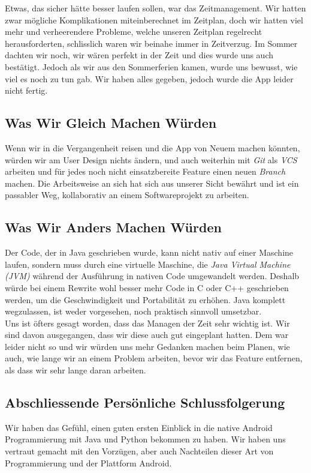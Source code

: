 \documentclass[a4paper,11pt]{article}
\begin{document}
Etwas, das sicher hätte besser laufen sollen, war das Zeitmanagement. Wir hatten zwar mögliche Komplikationen miteinberechnet im Zeitplan, doch wir hatten viel mehr und verheerendere Probleme, welche unseren Zeitplan regelrecht herausforderten, schlisslich waren wir beinahe immer in Zeitverzug. Im Sommer dachten wir noch, wir wären perfekt in der Zeit und dies wurde uns auch bestätigt. Jedoch
als wir aus den Sommerferien kamen, wurde uns bewusst, wie viel es noch zu tun gab. Wir haben alles gegeben, jedoch wurde die App leider nicht fertig. 

\subsection{Was Wir Gleich Machen Würden}
Wenn wir in die Vergangenheit reisen und die App von Neuem machen könnten, würden wir am User Design nichts ändern, und auch weiterhin mit \textit{Git} als \textit{VCS} arbeiten und für jedes noch nicht einsatzbereite Feature einen neuen \textit{Branch} machen. Die Arbeitsweise an sich hat sich aus unserer Sicht bewährt und ist ein passabler Weg, kollaborativ an einem Softwareprojekt zu arbeiten.


\subsection{Was Wir Anders Machen Würden}

Der Code, der in Java geschrieben wurde, kann nicht nativ auf einer Maschine laufen, sondern muss durch eine virtuelle Maschine, die \textit{Java Virtual Machine (JVM)} während der Ausführung in nativen Code umgewandelt werden. Deshalb würde bei einem Rewrite wohl besser mehr Code in C oder C++ geschrieben werden, um die Geschwindigkeit und Portabilität zu erhöhen. Java komplett wegzulassen, ist weder vorgesehen, noch praktisch sinnvoll umsetzbar. \\

Uns ist öfters gesagt worden, dass das Managen der Zeit sehr wichtig ist. Wir sind davon ausgegangen, dass wir diese auch gut eingeplant hatten. Dem war leider nicht so und wir 
würden uns mehr Gedanken machen beim Planen, wie auch, wie lange wir an einem Problem arbeiten, bevor wir das Feature entfernen, als dass wir sehr lange daran arbeiten. 


\subsection{Abschliessende Persönliche Schlussfolgerung}
Wir haben das Gefühl, einen guten ersten Einblick in die native Android Programmierung mit Java und Python bekommen zu haben. Wir haben uns vertraut gemacht mit den Vorzügen, aber auch Nachteilen dieser Art von Programmierung und der Plattform Android.\\
\end{document}
